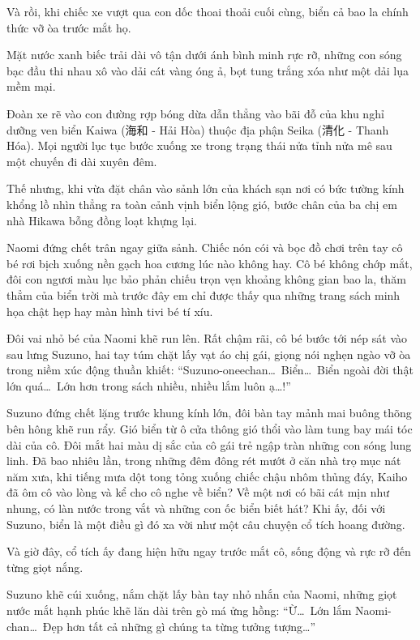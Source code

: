 \documentclass[../main.tex]{subfiles}
\begin{document}
Và rồi, khi chiếc xe vượt qua con dốc thoai thoải cuối cùng, biển cả bao la chính thức vỡ òa trước mắt họ.

Mặt nước xanh biếc trải dài vô tận dưới ánh bình minh rực rỡ, những con sóng bạc đầu thi nhau xô vào dải cát vàng óng ả, bọt tung trắng xóa như một dải lụa mềm mại.

Đoàn xe rẽ vào con đường rợp bóng dừa dẫn thẳng vào bãi đỗ của khu nghỉ dưỡng ven biển Kaiwa (海和 - Hải Hòa) thuộc địa phận Seika (清化 - Thanh Hóa). Mọi người lục tục bước xuống xe trong trạng thái nửa tỉnh nửa mê sau một chuyến đi dài xuyên đêm.

Thế nhưng, khi vừa đặt chân vào sảnh lớn của khách sạn nơi có bức tường kính khổng lồ nhìn thẳng ra toàn cảnh vịnh biển lộng gió, bước chân của ba chị em nhà Hikawa bỗng đồng loạt khựng lại.

Naomi đứng chết trân ngay giữa sảnh. Chiếc nón cói và bọc đồ chơi trên tay cô bé rơi bịch xuống nền gạch hoa cương lúc nào không hay. Cô bé không chớp mắt, đôi con ngươi màu lục bảo phản chiếu trọn vẹn khoảng không gian bao la, thăm thẳm của biển trời mà trước đây em chỉ được thấy qua những trang sách minh họa chật hẹp hay màn hình tivi bé tí xíu.

Đôi vai nhỏ bé của Naomi khẽ run lên. Rất chậm rãi, cô bé bước tới nép sát vào sau lưng Suzuno, hai tay túm chặt lấy vạt áo chị gái, giọng nói nghẹn ngào vỡ òa trong niềm xúc động thuần khiết: ``Suzuno-oneechan\dots\ Biển\dots\ Biển ngoài đời thật lớn quá\dots\ Lớn hơn trong sách nhiều, nhiều lắm luôn ạ\dots!''

Suzuno đứng chết lặng trước khung kính lớn, đôi bàn tay mảnh mai buông thõng bên hông khẽ run rẩy. Gió biển từ ô cửa thông gió thổi vào làm tung bay mái tóc dài của cô. Đôi mắt hai màu dị sắc của cô gái trẻ ngập tràn những con sóng lung linh. Đã bao nhiêu lần, trong những đêm đông rét mướt ở căn nhà trọ mục nát năm xưa, khi tiếng mưa dột tong tỏng xuống chiếc chậu nhôm thủng đáy, Kaiho đã ôm cô vào lòng và kể cho cô nghe về biển? Về một nơi có bãi cát mịn như nhung, có làn nước trong vắt và những con ốc biển biết hát? Khi ấy, đối với Suzuno, biển là một điều gì đó xa vời như một câu chuyện cổ tích hoang đường.

Và giờ đây, cổ tích ấy đang hiện hữu ngay trước mắt cô, sống động và rực rỡ đến từng giọt nắng.

Suzuno khẽ cúi xuống, nắm chặt lấy bàn tay nhỏ nhắn của Naomi, những giọt nước mắt hạnh phúc khẽ lăn dài trên gò má ửng hồng: ``Ừ\dots\ Lớn lắm Naomi-chan\dots\ Đẹp hơn tất cả những gì chúng ta từng tưởng tượng\dots''
\end{document}
